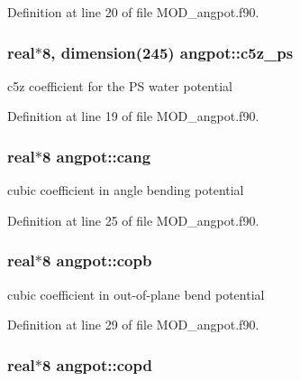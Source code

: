 Definition at line 20 of file M\-O\-D\-\_\-angpot.\-f90.

\hypertarget{classangpot_a1abb325651d097615a3d59f519f9ed2d}{
\subsubsection[{c5z\-\_\-ps}]{\setlength{\rightskip}{0pt plus 5cm}real$\ast$8, dimension(245) angpot\-::c5z\-\_\-ps}}\label{classangpot_a1abb325651d097615a3d59f519f9ed2d}


c5z coefficient for the P\-S water potential 



Definition at line 19 of file M\-O\-D\-\_\-angpot.\-f90.

\hypertarget{classangpot_ab027336e1adb73f303c64bef48b2076d}{
\subsubsection[{cang}]{\setlength{\rightskip}{0pt plus 5cm}real$\ast$8 angpot\-::cang}}\label{classangpot_ab027336e1adb73f303c64bef48b2076d}


cubic coefficient in angle bending potential 



Definition at line 25 of file M\-O\-D\-\_\-angpot.\-f90.

\hypertarget{classangpot_afce14bd92562300f4affafe4a4f54ed2}{
\subsubsection[{copb}]{\setlength{\rightskip}{0pt plus 5cm}real$\ast$8 angpot\-::copb}}\label{classangpot_afce14bd92562300f4affafe4a4f54ed2}


cubic coefficient in out-\/of-\/plane bend potential 



Definition at line 29 of file M\-O\-D\-\_\-angpot.\-f90.

\hypertarget{classangpot_af0b77277ecab0114f05807cbea726048}{
\subsubsection[{copd}]{\setlength{\rightskip}{0pt plus 5cm}real$\ast$8 angpot\-::copd}}\label{classangpot_af0b77277ecab0114f05807cbea726048}


